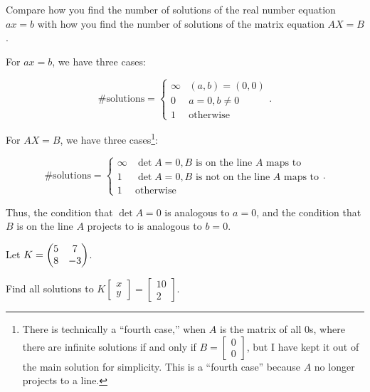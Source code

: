 \documentclass[../gatm_answers.tex]{subfiles}
\begin{document}
\begin{inner_problem}
\item Compare how you find the number of solutions of the real number equation $ax=b$ with how you find the number of solutions of the matrix equation $AX=B$.
\end{inner_problem}

For $ax=b$, we have three cases:

$$\text{\# solutions} = \begin{cases} \infty & (a,b)=(0,0) \\ 0 & a=0, b\neq 0 \\ 1 & \text{otherwise} \end{cases}.$$

For $AX=B$, we have three cases\footnote{There is technically a ``fourth case,'' when $A$ is the matrix of all $0$s, where there are infinite solutions if and only if $B=\left[\begin{smallmatrix} 0 \\ 0 \end{smallmatrix}\right]$, but I have kept it out of the main solution for simplicity. This is a ``fourth case'' because $A$ no longer projects to a line.}:

$$\text{\# solutions} = \begin{cases} \infty & \det A = 0, B\text{ is on the line }A\text{ maps to} \\ 1 & \det A = 0, B\text{ is not on the line }A\text{ maps to} \\ 1 & \text{otherwise} \end{cases}.$$

Thus, the condition that $\det A = 0$ is analogous to $a=0$, and the condition that $B$ is on the line $A$ projects to is analogous to $b=0$.

\begin{outer_problem}
\item Let $K=\begin{pmatrix} 5 & 7 \\ 8 & -3 \end{pmatrix}$.
\end{outer_problem}

\begin{inner_problem}[start=1]
\item Find all solutions to $K\left[\begin{array}{c} x \\ y \end{array}\right]=\left[\begin{array}{c} 10 \\ 2 \end{array}\right]$.
\end{inner_problem}
\end{document}
